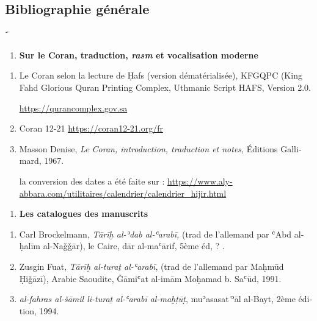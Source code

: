 \documentclass[a4paper,12pt]{report}
\begin{document}
\begin{french}
    




\chapter*{Bibliographie générale}

ََ  
   \begin{enumerate} [I]
        \item  \textbf  {Sur le Coran, traduction,  \textit{rasm} et vocalisation moderne}
        \end{enumerate}

        \begin{enumerate}
           

      
       \item   Le Coran selon la lecture de Ḥafs (version dématérialisée), KFGQPC (King Fahd Glorious Quran Printing Complex, Uthmanic Script HAFS, Version  2.0.  
       
       \url{https://qurancomplex.gov.sa}

       
       
       \item Coran 12-21  \url {https://coran12-21.org/fr}  
       \item  Masson Denise,\textit{ Le Coran, introduction, traduction et notes}, Éditions Gallimard, 1967.
       
      

     la conversion des dates a été faite  sur : \url{https://www.aly-abbara.com/utilitaires/calendrier/calendrier_hijir.html}
   \end{enumerate}  


   \begin{enumerate} [II]
        \item  \textbf  {Les catalogues des manuscrits }
        \end{enumerate}
\begin{enumerate}
\item Carl Brockelmann, \textit { Tārīḫ al-ʾdab al-ʿarabī, } (trad de l’allemand par ʿAbd al-ḥalīm al-Naǧǧār), le Caire, dār al-maʿārif, 5ème éd, ? .
    

\item  Zusgin Fuat, \textit{Tār\=iḫ al-turaṯ al-ʿarabī}, (trad de l'allemand par Maḥmūd Ḥiǧāzī), Arabie Saoudite, Ǧāmiʿat al-imām Moḥamad b. Saʿ\=ud,  1991. 

 \item  \textit{al-fahras al-šāmil li-turaṯ al-ʿarabī al-maḫṭūt}̣, muʾasasat  ͗ʾāl al-Bayt,  2ème édition, 1994.
 

\end{enumerate}
\end{french}
\end{document}

